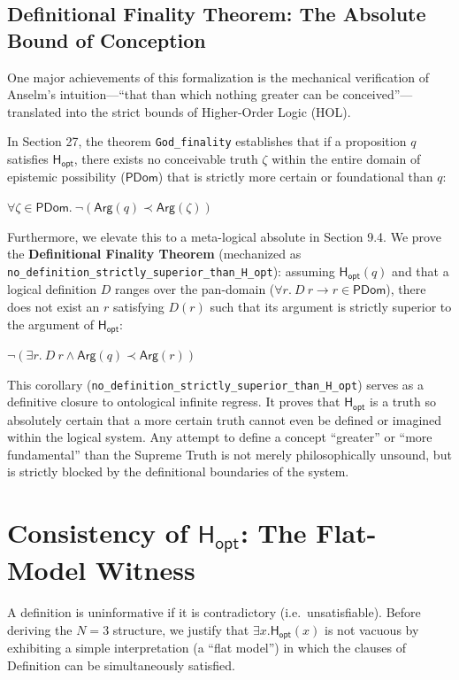 \documentclass[a4paper, 11pt]{article}
\theoremstyle{plain}
\theoremstyle{definition}
\newcommand{\Arg}{\mathsf{Arg}}           %
\newcommand{\Hopt}{\mathsf{H_{opt}}}       %
\newcommand{\PDom}{\mathsf{PDom}}         %
\begin{document}
\subsection{Definitional Finality Theorem: The Absolute Bound of Conception}
One major achievements of this formalization is the mechanical verification of Anselm's intuition---``that than which nothing greater can be conceived''---translated into the strict bounds of Higher-Order Logic (HOL).

In Section 27, the theorem \texttt{God\_finality} establishes that if a proposition $q$ satisfies $\Hopt$, there exists no conceivable truth $\zeta$ within the entire domain of epistemic possibility ($\PDom$) that is strictly more certain or foundational than $q$:
\begin{center}
    $\forall \zeta \in \PDom.\ \neg (\Arg(q) \prec \Arg(\zeta))$
\end{center}

Furthermore, we elevate this to a meta-logical absolute in Section 9.4. We prove the \textbf{Definitional Finality Theorem} (mechanized as \texttt{no\_definition\_strictly\_superior\_than\_H\_opt}): assuming $\Hopt(q)$ and that a logical definition $D$ ranges over the pan-domain ($\forall r.\ D\ r \longrightarrow r \in \PDom$), there does not exist an $r$ satisfying $D(r)$ such that its argument is strictly superior to the argument of $\Hopt$:
\begin{center}
    $\neg (\exists r.\ D\ r \land \Arg(q) \prec \Arg(r))$
\end{center}
This corollary (\texttt{no\_definition\_strictly\_superior\_than\_H\_opt}) serves as a definitive closure to ontological infinite regress. It proves that $\Hopt$ is a truth so absolutely certain that a more certain truth cannot even be defined or imagined within the logical system. Any attempt to define a concept ``greater'' or ``more fundamental'' than the Supreme Truth is not merely philosophically unsound, but is strictly blocked by the definitional boundaries of the system.


\section{Consistency of $\Hopt$: The Flat-Model Witness}
\label{sec:consistency}

A definition is uninformative if it is contradictory (i.e.\ unsatisfiable). Before deriving the $N=3$ structure, we justify that $\exists x.\Hopt(x)$ is not vacuous by exhibiting a simple interpretation (a ``flat model'') in which the clauses of Definition can be simultaneously satisfied.
\end{document}
